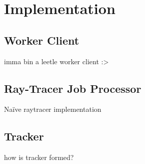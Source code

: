 \chapter{Implementation}

\section{Worker Client}
imma bin a leetle worker client :>

\section{Ray-Tracer Job Processor}
Naïve raytracer implementation

\section{Tracker}
how is tracker formed?